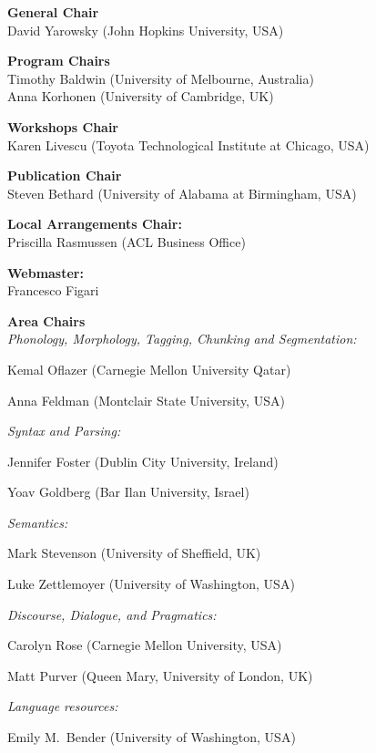 \renewcommand{\leftheader}{EMNLP Organizing committee}
\renewcommand{\rightheader}{EMNLP Organizing committee}

{\small
\noindent
\textbf{General Chair}\\
David Yarowsky (John Hopkins University, USA)

\smallskip
\noindent
\textbf{Program Chairs}\\
Timothy Baldwin (University of Melbourne, Australia)\\
Anna Korhonen (University of Cambridge, UK)

\smallskip
\noindent
\textbf{Workshops Chair}\\
Karen Livescu (Toyota Technological Institute at Chicago, USA)

\smallskip
\noindent
\textbf{Publication Chair}\\
Steven Bethard (University of Alabama at Birmingham, USA)

\smallskip
\noindent
\textbf{Local Arrangements Chair:}\\
Priscilla Rasmussen (ACL Business Office)

\smallskip
\noindent
\textbf{Webmaster:}\\
Francesco Figari

\medskip
\noindent
\textbf{Area Chairs}\\
\textit{Phonology, Morphology, Tagging, Chunking and Segmentation:}

Kemal Oflazer (Carnegie Mellon University Qatar)

Anna Feldman (Montclair State University, USA)

\noindent
\textit{Syntax and Parsing:}

Jennifer Foster (Dublin City University, Ireland)

Yoav Goldberg (Bar Ilan University, Israel)

\noindent
\textit{Semantics:}

Mark Stevenson (University of Sheffield, UK)

Luke Zettlemoyer (University of Washington, USA)

\noindent
\textit{Discourse, Dialogue, and Pragmatics:}

Carolyn Rose (Carnegie Mellon University, USA)

Matt Purver (Queen Mary, University of London, UK)

\noindent
\textit{Language resources:}

Emily M.\ Bender (University of Washington, USA)

}
